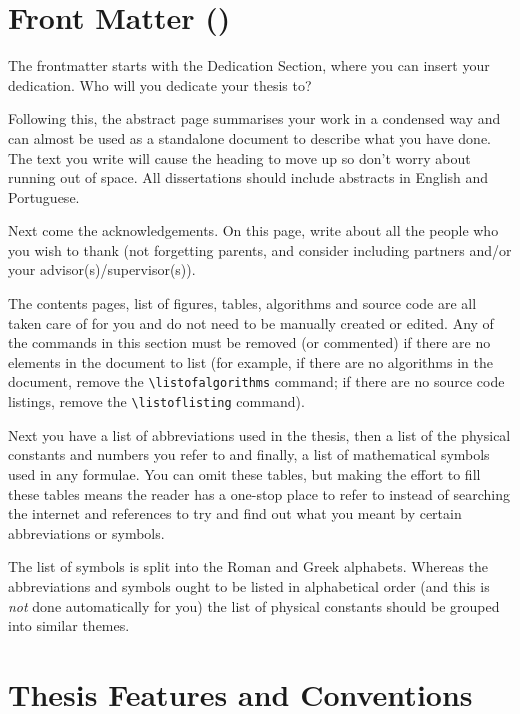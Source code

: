 \section{Front Matter ()}
\label{sec:frontmatter}

The frontmatter starts with the Dedication Section, where you can insert your dedication. Who will you dedicate your thesis to?

Following this, the abstract page summarises your work in a condensed way and can almost be used as a standalone document to describe what you have done. The text you write will cause the heading to move up so don't worry about running out of space. All dissertations should include abstracts in English and Portuguese.

Next come the acknowledgements. On this page, write about all the people who you wish to thank (not forgetting parents, and consider including partners and/or your advisor(s)/supervisor(s)).

The contents pages, list of figures, tables, algorithms and source code are all taken care of for you and do not need to be manually created or edited. Any of the commands in this section must be removed (or commented) if there are no elements in the document to list (for example, if there are no algorithms in the document, remove the \verb|\listofalgorithms| command; if there are no source code listings, remove the \verb|\listoflisting| command).

Next you have a list of abbreviations used in the thesis, then a list of the physical constants and numbers you refer to and finally, a list of mathematical symbols used in any formulae. You can omit these tables, but making the effort to fill these tables means the reader has a one-stop place to refer to instead of searching the internet and references to try and find out what you meant by certain abbreviations or symbols.

The list of symbols is split into the Roman and Greek alphabets. Whereas the abbreviations and symbols ought to be listed in alphabetical order (and this is \emph{not} done automatically for you) the list of physical constants should be grouped into similar themes.


\section{Thesis Features and Conventions}\label{ThesisConventions}

